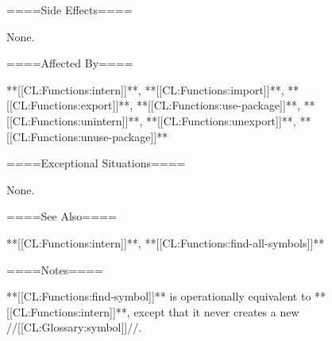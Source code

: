 ====Side Effects====

None.

====Affected By====

**[[CL:Functions:intern]]**, **[[CL:Functions:import]]**, **[[CL:Functions:export]]**, **[[CL:Functions:use-package]]**, **[[CL:Functions:unintern]]**, **[[CL:Functions:unexport]]**, **[[CL:Functions:unuse-package]]**

====Exceptional Situations====

None.

====See Also====

**[[CL:Functions:intern]]**, **[[CL:Functions:find-all-symbols]]**

====Notes====

**[[CL:Functions:find-symbol]]** is operationally equivalent to **[[CL:Functions:intern]]**, except that it never creates a new //[[CL:Glossary:symbol]]//.

